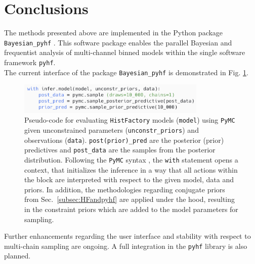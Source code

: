 \section{Conclusions}\label{sec:conclusions}

The methods presented above are implemented in the Python package \texttt{Bayesian\_pyhf} \cite{BayesianPyhf}. This software package enables the parallel Bayesian and frequentist analysis of multi-channel binned models within the single software framework \texttt{pyhf}.\\
The current interface of the package \texttt{Bayesian\_pyhf} is demonstrated in Fig. \ref{code}.
    \begin{figure} %
        \centering
        \includegraphics[width=9cm]{figures/code2.png}
        \centering
        \caption{Pseudo-code for evaluating \texttt{HistFactory} models (\texttt{model}) using \texttt{PyMC} given unconstrained parameters (\texttt{unconstr\_priors}) and observations (\texttt{data}). \texttt{post(prior)\_pred} are the posterior (prior) predictives and \texttt{post\_data} are the samples from the posterior distribution. Following the \texttt{PyMC} syntax \cite{PyMC}, the \texttt{with} statement opens a context, that initializes the inference in a way that all actions within the block are interpreted with respect to the given model, data and priors. In addition, the methodologies regarding conjugate priors from Sec.~\ref{subsec:HFandpyhf} are applied under the hood, resulting in the constraint priors which are added to the model parameters for sampling.}
        \label{code}
    \end{figure}
\noindent Further enhancements regarding the user interface and stability with respect to multi-chain sampling are ongoing. A full integration in the \texttt{pyhf} library is also planned.
